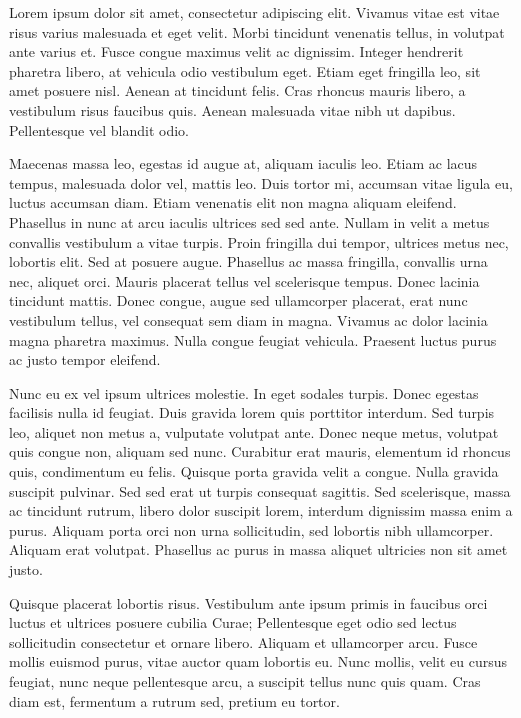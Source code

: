 \begin{tueSUMARIO}

  Lorem ipsum dolor sit amet, consectetur adipiscing elit. Vivamus vitae est
  vitae risus varius malesuada et eget velit. Morbi tincidunt venenatis tellus,
  in volutpat ante varius et. Fusce congue maximus velit ac dignissim. Integer
  hendrerit pharetra libero, at vehicula odio vestibulum eget. Etiam eget
  fringilla leo, sit amet posuere nisl. Aenean at tincidunt felis. Cras rhoncus
  mauris libero, a vestibulum risus faucibus quis. Aenean malesuada vitae nibh
  ut dapibus. Pellentesque vel blandit odio.

  Maecenas massa leo, egestas id augue at, aliquam iaculis leo. Etiam ac lacus
  tempus, malesuada dolor vel, mattis leo. Duis tortor mi, accumsan vitae
  ligula eu, luctus accumsan diam. Etiam venenatis elit non magna aliquam
  eleifend. Phasellus in nunc at arcu iaculis ultrices sed sed ante. Nullam in
  velit a metus convallis vestibulum a vitae turpis. Proin fringilla dui
  tempor, ultrices metus nec, lobortis elit. Sed at posuere augue. Phasellus ac
  massa fringilla, convallis urna nec, aliquet orci. Mauris placerat tellus vel
  scelerisque tempus. Donec lacinia tincidunt mattis. Donec congue, augue sed
  ullamcorper placerat, erat nunc vestibulum tellus, vel consequat sem diam in
  magna. Vivamus ac dolor lacinia magna pharetra maximus. Nulla congue feugiat
  vehicula. Praesent luctus purus ac justo tempor eleifend.

  Nunc eu ex vel ipsum ultrices molestie. In eget sodales turpis. Donec egestas
  facilisis nulla id feugiat. Duis gravida lorem quis porttitor interdum. Sed
  turpis leo, aliquet non metus a, vulputate volutpat ante. Donec neque metus,
  volutpat quis congue non, aliquam sed nunc. Curabitur erat mauris, elementum
  id rhoncus quis, condimentum eu felis. Quisque porta gravida velit a congue.
  Nulla gravida suscipit pulvinar. Sed sed erat ut turpis consequat sagittis.
  Sed scelerisque, massa ac tincidunt rutrum, libero dolor suscipit lorem,
  interdum dignissim massa enim a purus. Aliquam porta orci non urna
  sollicitudin, sed lobortis nibh ullamcorper. Aliquam erat volutpat. Phasellus
  ac purus in massa aliquet ultricies non sit amet justo.

  Quisque placerat lobortis risus. Vestibulum ante ipsum primis in faucibus orci
  luctus et ultrices posuere cubilia Curae; Pellentesque eget odio sed lectus
  sollicitudin consectetur et ornare libero. Aliquam et ullamcorper arcu. Fusce
  mollis euismod purus, vitae auctor quam lobortis eu. Nunc mollis, velit eu
  cursus feugiat, nunc neque pellentesque arcu, a suscipit tellus nunc quis
  quam. Cras diam est, fermentum a rutrum sed, pretium eu tortor.

\end{tueSUMARIO}
